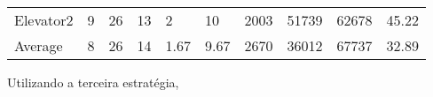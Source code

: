 \documentclass[a4paper]{article}
\begin{document}
\begin{table}[h]
\begin{tabular}{@{}llllllllll@{}}
Elevator2 & 9        & 26            & 13           & 2                                                               & 10                                                                  & 2003                                                         & 51739                                                 & 62678                                                   & 45.22         \\
Average   & 8     & 26         & 14        & 1.67                                                            & 9.67                                                               & 2670                                                         & 36012                                                 & 67737                                                   &  32.89         \\ \bottomrule
\end{tabular}
\end{table}

\newpage

Utilizando a terceira estratégia,
\end{document}

